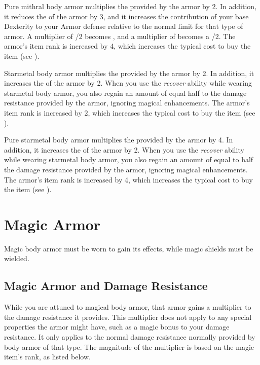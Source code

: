          Pure mithral body armor multiplies the  provided by the armor by 2.
        In addition, it reduces the  of the armor by 3, and it increases the contribution of your base Dexterity to your Armor defense relative to the normal limit for that type of armor.
        A multiplier of /2 becomes , and a multiplier of  becomes a /2.
        The armor's item rank is increased by 4, which increases the typical cost to buy the item (see ).

         Starmetal body armor multiplies the  provided by the armor by 2.
        In addition, it increases the  of the armor by 2.
        When you use the \textit{recover} ability while wearing starmetal body armor, you also regain an amount of  equal half to the damage resistance provided by the armor, ignoring magical enhancements.
        The armor's item rank is increased by 2, which increases the typical cost to buy the item (see ).

         Pure starmetal body armor multiplies the  provided by the armor by 4.
        In addition, it increases the  of the armor by 2.
        When you use the \textit{recover} ability while wearing starmetal body armor, you also regain an amount of  equal to half the damage resistance provided by the armor, ignoring magical enhancements.
        The armor's item rank is increased by 4, which increases the typical cost to buy the item (see ).

\newpage
\section{Magic Armor}
    Magic body armor must be worn to gain its effects, while magic shields must be wielded.

    \subsection{Magic Armor and Damage Resistance}
        While you are attuned to magical body armor, that armor gains a multiplier to the damage resistance it provides.
        This multiplier does not apply to any special properties the armor might have, such as a magic bonus to your damage resistance.
        It only applies to the normal damage resistance normally provided by body armor of that type.
        The magnitude of the multiplier is based on the magic item's rank, as listed below.

